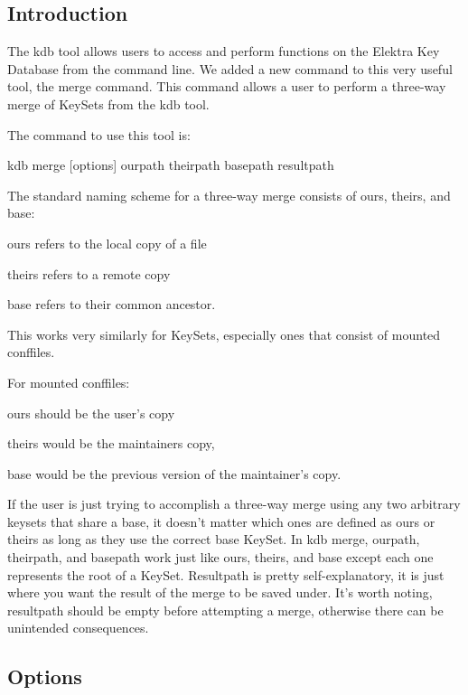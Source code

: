 \subsection*{Introduction}

The kdb tool allows users to access and perform functions on the Elektra Key Database from the command line. We added a new command to this very useful tool, the merge command. This command allows a user to perform a three-\/way merge of Key\+Sets from the kdb tool.

The command to use this tool is\+: \begin{DoxyVerb}    kdb merge [options] ourpath theirpath basepath resultpath
\end{DoxyVerb}


The standard naming scheme for a three-\/way merge consists of ours, theirs, and base\+:
\begin{DoxyItemize}
\item ours refers to the local copy of a file
\item theirs refers to a remote copy
\item base refers to their common ancestor.
\end{DoxyItemize}

This works very similarly for Key\+Sets, especially ones that consist of mounted conffiles.

For mounted conffiles\+:
\begin{DoxyItemize}
\item ours should be the user's copy
\item theirs would be the maintainers copy,
\item base would be the previous version of the maintainer's copy.
\end{DoxyItemize}

If the user is just trying to accomplish a three-\/way merge using any two arbitrary keysets that share a base, it doesn't matter which ones are defined as ours or theirs as long as they use the correct base Key\+Set. In kdb merge, ourpath, theirpath, and basepath work just like ours, theirs, and base except each one represents the root of a Key\+Set. Resultpath is pretty self-\/explanatory, it is just where you want the result of the merge to be saved under. It's worth noting, resultpath should be empty before attempting a merge, otherwise there can be unintended consequences.

\subsection*{Options}

